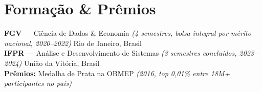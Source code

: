 \documentclass[10pt,a4paper]{article}
\begin{document}
\section{Formação \& Prêmios}
\textbf{FGV} --- Ciência de Dados \& Economia \textit{(4 semestres, bolsa integral por mérito nacional, \mbox{2020--2022})} \hfill Rio de Janeiro, Brasil \\
\textbf{IFPR} --- Análise e Desenvolvimento de Sistemas \textit{(3 semestres concluídos, \mbox{2023--2024})} \hfill União da Vitória, Brasil \\
\textbf{Prêmios:} Medalha de Prata na OBMEP \textit{(2016, top 0,01\% entre 18M+ participantes no país)}
\end{document}
